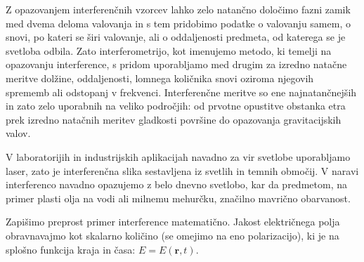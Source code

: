 Z opazovanjem interferenčnih vzorcev lahko zelo natančno določimo fazni zamik med
dvema deloma valovanja in s tem pridobimo podatke o valovanju samem, o snovi, po 
kateri se širi valovanje, ali o oddaljenosti predmeta, od katerega se je svetloba odbila. 
Zato interferometrijo, kot imenujemo metodo, ki temelji na opazovanju interference,
s pridom uporabljamo med drugim za izredno natačne meritve dolžine, 
oddaljenosti, lomnega količnika snovi oziroma njegovih sprememb ali odstopanj v frekvenci. 
Interferenčne meritve so ene najnatančnejših in zato zelo uporabnih na veliko področjih:
od prvotne opustitve obstanka etra prek izredno natačnih meritev gladkosti površine do
opazovanja gravitacijskih valov. 

V laboratorijih in industrijskih aplikacijah navadno za vir svetlobe uporabljamo laser, zato
je interferenčna slika sestavljena iz svetlih in temnih območij. V naravi interferenco
navadno opazujemo z belo dnevno svetlobo, kar da predmetom, na primer plasti olja na vodi ali
milnemu mehurčku, značilno mavrično obarvanost.

Zapišimo preprost primer interference matematično. Jakost električnega polja
obravnavajmo kot skalarno količino (se omejimo na eno polarizacijo), ki je na splošno
funkcija kraja in časa: $E= E(\mathbf{r},t)$. 

